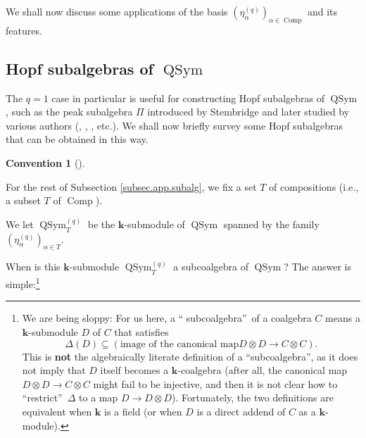 \documentclass[numbers=enddot,12pt,final,onecolumn,notitlepage]{scrartcl}%
\theoremstyle{definition}
\newtheorem{conv}[theo]{Convention}
\newenvironment{convention}[1][]
{\begin{conv}[#1]\begin{leftbar}}
{\end{leftbar}\end{conv}}
\begin{document}
We shall now discuss some applications of the basis $\left(  \eta_{\alpha
}^{\left(  q\right)  }\right)  _{\alpha\in\operatorname*{Comp}}$ and its features.

\subsection{\label{subsec.app.subalg}Hopf subalgebras of $\operatorname*{QSym}%
$}

The $q=1$ case in particular is useful for constructing Hopf subalgebras of
$\operatorname*{QSym}$, such as the peak subalgebra $\Pi$ introduced by
Stembridge \cite[\S 3]{Stembr97} and later studied by various authors
(\cite[\S 6, particularly Proposition 6.5]{AgBeSo14}, \cite{BMSW99},
\cite[\S 5]{BMSW00}, \cite{Hsiao07} etc.). We shall now briefly survey some
Hopf subalgebras that can be obtained in this way.

\begin{convention}
For the rest of Subsection \ref{subsec.app.subalg}, we fix a set $T$ of
compositions (i.e., a subset $T$ of $\operatorname*{Comp}$).

We let $\operatorname*{QSym}\nolimits_{T}^{\left(  q\right)  }$ be the
$\mathbf{k}$-submodule of $\operatorname*{QSym}$ spanned by the family
$\left(  \eta_{\alpha}^{\left(  q\right)  }\right)  _{\alpha\in T}$.
\end{convention}

When is this $\mathbf{k}$-submodule $\operatorname*{QSym}\nolimits_{T}%
^{\left(  q\right)  }$ a subcoalgebra of $\operatorname*{QSym}$? The answer is
simple:\footnote{We are being sloppy: For us here, a \textquotedblleft
subcoalgebra\textquotedblright\ of a coalgebra $C$ means a $\mathbf{k}%
$-submodule $D$ of $C$ that satisfies
\[
\Delta\left(  D\right)  \subseteq\left(  \text{image of the canonical map
}D\otimes D\rightarrow C\otimes C\right)  .
\]
This is \textbf{not} the algebraically literate definition of a
\textquotedblleft subcoalgebra\textquotedblright, as it does not imply that
$D$ itself becomes a $\mathbf{k}$-coalgebra (after all, the canonical map
$D\otimes D\rightarrow C\otimes C$ might fail to be injective, and then it is
not clear how to \textquotedblleft restrict\textquotedblright\ $\Delta$ to a
map $D\rightarrow D\otimes D$). Fortunately, the two definitions are
equivalent when $\mathbf{k}$ is a field (or when $D$ is a direct addend of $C$
as a $\mathbf{k}$-module).}
\end{document}
